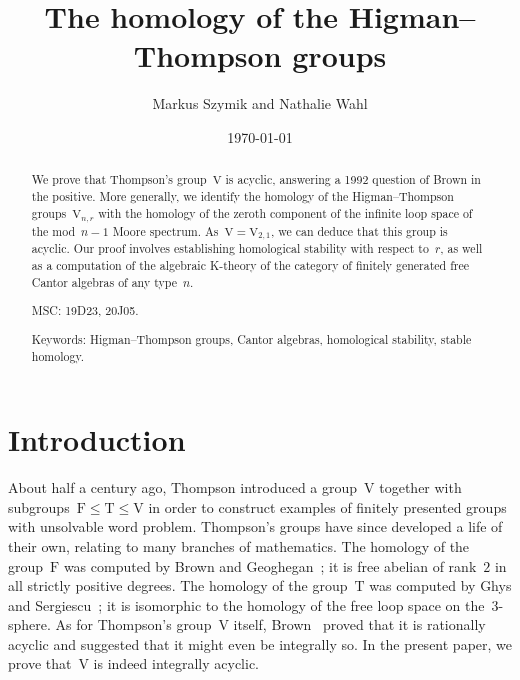 \documentclass[10pt]{article}
\title{{The homology of the Higman--Thompson groups}}
\author{Markus Szymik and Nathalie Wahl}
\date{\mydate\today}
\newcommand{\rmF}{\mathrm{F}}
\newcommand{\rmT}{\mathrm{T}}
\newcommand{\rmV}{\mathrm{V}}
\theoremstyle{definition}
\numberwithin{theorem}{section}
\numberwithin{equation}{section}
\numberwithin{figure}{section}
\begin{document}
\maketitle

\renewcommand{\abstractname}{}

\begin{abstract}
\noindent  
We prove that Thompson's group~$\rmV$ is acyclic, answering a 1992 question of Brown in the positive. More generally, we identify the homology of the Higman--Thompson groups~$\rmV_{n,r}$ with the homology of the zeroth component of the infinite loop space of the mod~$n-1$ Moore spectrum. As~$\rmV=\rmV_{2,1}$, we can deduce that this group is acyclic. 
Our proof %
involves establishing homological stability with respect to~$r$, as well as a computation of the algebraic K-theory of the category of finitely generated free Cantor algebras of any type~$n$. 
\vspace{\baselineskip}

\noindent MSC: 
19D23, %
20J05. %
\vspace{\baselineskip}

\noindent Keywords: 
Higman--Thompson groups, Cantor algebras, homological stability, stable homology.
\end{abstract}


\section*{Introduction}



About half a century ago, Thompson introduced a group~$\rmV$ together with subgroups~$\rmF\leqslant\rmT\leqslant\rmV$ in order  to construct examples of finitely presented groups with  unsolvable word problem. 
Thompson's groups have since developed a life of their own, relating to many branches of  mathematics. %
The homology of the group~$\rmF$ was computed by Brown and Geoghegan~\cite{Brown+Geoghegan}; it is free abelian of rank~$2$ in all strictly positive degrees. The homology of the group~$\rmT$ was computed by Ghys and Sergiescu~\cite{Ghys+Sergiescu}; it is isomorphic to the homology of the free loop space on the~$3$-sphere.
As for Thompson's group~$\rmV$ itself, Brown~\cite{Brown:Suggestion} proved that it is rationally acyclic and suggested that it might even be integrally so. 
In the present paper, we prove that~$\rmV$ is indeed integrally acyclic. 
\end{document}
